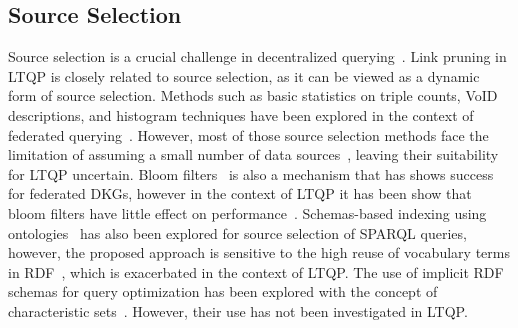 \subsection{Source Selection}
Source selection is a crucial challenge in decentralized querying~\cite{hose2012towards, Harth2010}. 
Link pruning in LTQP is closely related to source selection, as it can be viewed as a dynamic form of source selection.
Methods such as basic statistics on triple counts, VoID descriptions, and histogram techniques have been explored in the context of federated querying~\cite{hose2012towards, Harth2010, Montoya2017}.
However, most of those source selection methods face the limitation of assuming a small number of data sources~\cite{Harth2010}, leaving their suitability for LTQP uncertain.
Bloom filters~\cite{dia2018fast} is also a mechanism that has shows success for federated DKGs, however in the context of LTQP it has been show that bloom filters have little effect on performance~\cite{Hanski2024}.
Schemas-based indexing using ontologies~\cite{Stuckenschmidt2004} has also been explored for source selection of SPARQL queries,
however, the proposed approach is sensitive to the high reuse of vocabulary terms in RDF~\cite{Harth2010}, which is exacerbated in the context of LTQP.
The use of implicit RDF schemas for query optimization has been explored with the concept of characteristic sets~\cite{Neumann2011CharacteristicSA, Meimaris2017ExtendedCS, Montoya2017}.
However, their use has not been investigated in LTQP.